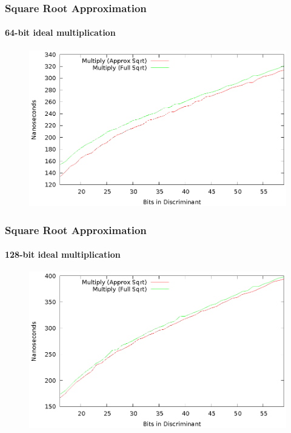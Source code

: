 \documentclass{beamer}
\begin{document}
\begin{frame}
\frametitle{Square Root Approximation}
\framesubtitle{64-bit ideal multiplication}
\begin{figure}
\includegraphics[scale=0.86]{compose-sqrtopt-64}
\end{figure}
\end{frame}

\begin{frame}
\frametitle{Square Root Approximation}
\framesubtitle{128-bit ideal multiplication}
\begin{figure}
\includegraphics[scale=0.86]{compose-sqrtopt-128}
\end{figure}
\end{frame}
\end{document}
